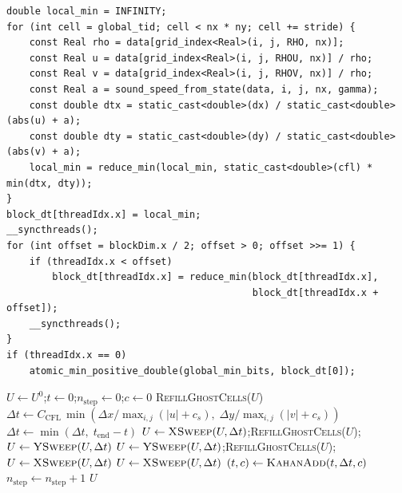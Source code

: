 \begin{lstlisting}[style=fpListing,
  caption={CUDA CFL block reduction. Each thread keeps a local minimum time step; the block writes one ordered atomic minimum, so the reduction is a comparison tree.},
  label=lst:cfl-kernel]
double local_min = INFINITY;
for (int cell = global_tid; cell < nx * ny; cell += stride) {
    const Real rho = data[grid_index<Real>(i, j, RHO, nx)];
    const Real u = data[grid_index<Real>(i, j, RHOU, nx)] / rho;
    const Real v = data[grid_index<Real>(i, j, RHOV, nx)] / rho;
    const Real a = sound_speed_from_state(data, i, j, nx, gamma);
    const double dtx = static_cast<double>(dx) / static_cast<double>(abs(u) + a);
    const double dty = static_cast<double>(dy) / static_cast<double>(abs(v) + a);
    local_min = reduce_min(local_min, static_cast<double>(cfl) * min(dtx, dty));
}
block_dt[threadIdx.x] = local_min;
__syncthreads();
for (int offset = blockDim.x / 2; offset > 0; offset >>= 1) {
    if (threadIdx.x < offset)
        block_dt[threadIdx.x] = reduce_min(block_dt[threadIdx.x],
                                           block_dt[threadIdx.x + offset]);
    __syncthreads();
}
if (threadIdx.x == 0)
    atomic_min_positive_double(global_min_bits, block_dt[0]);
\end{lstlisting}

\begin{algorithm}
\caption[Time-stepping loop with dimensional splitting]{\textbf{Time-stepping loop with dimensional splitting and Kahan-compensated time accumulation.}
The CFL coefficient is fixed per case: $C_{\mathrm{CFL}} = 0.8$ for 1D tests, $0.5$ for LW3, $0.4$ for LW12.
\emph{Step parity symmetrises X/Y sweep order.}}
\label{alg:step-dispatch}
\begin{algorithmic}[1]
  \State $U \gets U^{0}$;\quad $t \gets 0$;\quad $n_{\mathrm{step}} \gets 0$;\quad $c \gets 0$ 
    \State \textsc{RefillGhostCells}($U$)
    \State $\Delta t \gets C_{\mathrm{CFL}}\,\min\!\left(\Delta x/\max_{i,j}(|u|+c_s),\;\Delta y/\max_{i,j}(|v|+c_s)\right)$ 
    \State $\Delta t \gets \min(\Delta t,\; t_{\mathrm{end}} - t)$ 
      \State $U \gets \textsc{XSweep}(U, \Delta t)$;\quad \textsc{RefillGhostCells}($U$);\quad $U \gets \textsc{YSweep}(U, \Delta t)$
      \State $U \gets \textsc{YSweep}(U, \Delta t)$;\quad \textsc{RefillGhostCells}($U$);\quad $U \gets \textsc{XSweep}(U, \Delta t)$
    \Else
      \State $U \gets \textsc{XSweep}(U, \Delta t)$ 
    \EndIf
    \State $(t, c) \gets \textsc{KahanAdd}(t, \Delta t, c)$ 
    \State $n_{\mathrm{step}} \gets n_{\mathrm{step}} + 1$
  \EndWhile
  \State \Return $U$
\EndFunction
\end{algorithmic}
\end{algorithm}

